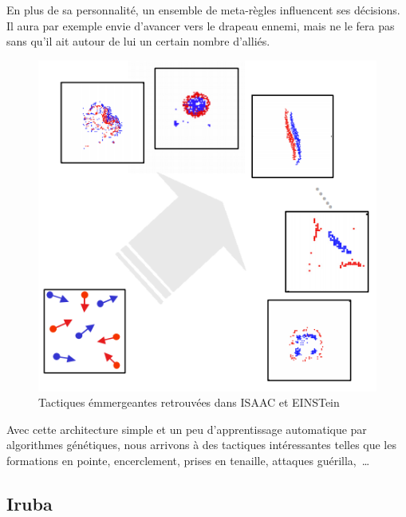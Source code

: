 \documentclass{article}
\begin{document}
En plus de sa personnalité, un ensemble de \og{}meta-règles\fg{} influencent ses décisions. Il aura par exemple envie d'avancer vers le drapeau ennemi, mais ne le fera pas sans qu'il ait autour de lui un certain nombre d'alliés.

\begin{figure}[H]
	\begin{center}
	\includegraphics[width=0.75\linewidth]{../ressources/einstein_global_behavior}
	\caption{Tactiques émmergeantes retrouvées dans ISAAC et EINSTein}
	\end{center}
\end{figure}

Avec cette architecture simple et un peu d'apprentissage automatique par algorithmes génétiques, nous arrivons à des tactiques intéressantes telles que les formations en pointe, encerclement, prises en tenaille, attaques guérilla,~\dots

\subsection{Iruba}
\end{document}
